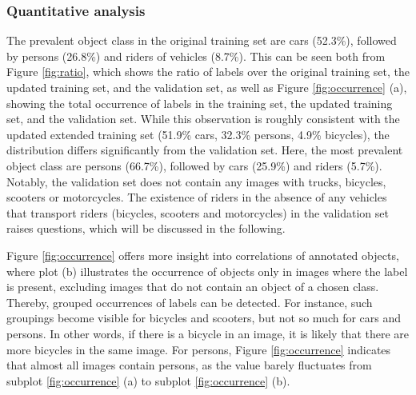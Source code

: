 \documentclass{article}
\begin{document}
\subsubsection*{Quantitative analysis}
The prevalent object class in the original training set are cars (52.3\%), followed by persons (26.8\%) and riders of vehicles (8.7\%). This can be seen both from Figure \ref{fig:ratio}, which shows the ratio of labels over the original training set, the updated training set, and the validation set, as well as Figure \ref{fig:occurrence} (a), showing the total occurrence of labels in the training set, the updated training set, and the validation set. While this observation is roughly consistent with the updated extended training set (51.9\% cars, 32.3\% persons, 4.9\% bicycles), the distribution differs significantly from the validation set. Here, the most prevalent object class are persons (66.7\%), followed by cars (25.9\%) and riders (5.7\%). Notably, the validation set does not contain any images with trucks, bicycles, scooters or motorcycles. The existence of riders in the absence of any vehicles that transport riders (bicycles, scooters and motorcycles) in the validation set raises questions, which will be discussed in the following.

Figure \ref{fig:occurrence} offers more insight into correlations of annotated objects, where plot (b) illustrates the occurrence of objects only in images where the label is present, excluding images that do not contain an object of a chosen class. Thereby, grouped occurrences of labels can be detected. For instance, such groupings become visible for bicycles and scooters, but not so much for cars and persons. In other words, if there is a bicycle in an image, it is likely that there are more bicycles in the same image. For persons, Figure \ref{fig:occurrence} indicates that almost all images contain persons, as the value barely fluctuates from subplot \ref{fig:occurrence} (a) to subplot \ref{fig:occurrence} (b).
\end{document}
